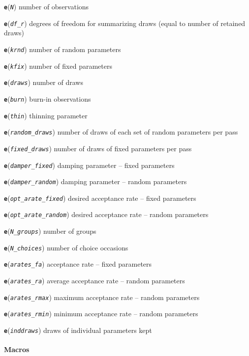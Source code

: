 \documentclass[11pt]{article}
\begin{document}
\textbf{\texttt{e}}(\emph{\texttt{N}}) number of observations

\textbf{\texttt{e}}(\emph{\texttt{df\_r}}) degrees of freedom for
summarizing draws (equal to number of retained draws)

\textbf{\texttt{e}}(\emph{\texttt{krnd}}) number of random parameters

\textbf{\texttt{e}}(\emph{\texttt{kfix}}) number of fixed parameters

\textbf{\texttt{e}}(\emph{\texttt{draws}}) number of draws

\textbf{\texttt{e}}(\emph{\texttt{burn}}) burn-in observations

\textbf{\texttt{e}}(\emph{\texttt{thin}}) thinning parameter

\textbf{\texttt{e}}(\emph{\texttt{random\_draws}}) number of draws of
each set of random parameters per pass

\textbf{\texttt{e}}(\emph{\texttt{fixed\_draws}}) number of draws of
fixed parameters per pass

\textbf{\texttt{e}}(\emph{\texttt{damper\_fixed}}) damping parameter --
fixed parameters

\textbf{\texttt{e}}(\emph{\texttt{damper\_random}}) damping parameter --
random parameters

\textbf{\texttt{e}}(\emph{\texttt{opt\_arate\_fixed}}) desired
acceptance rate -- fixed parameters

\textbf{\texttt{e}}(\emph{\texttt{opt\_arate\_random}}) desired
acceptance rate -- random parameters

\textbf{\texttt{e}}(\emph{\texttt{N\_groups}}) number of groups

\textbf{\texttt{e}}(\emph{\texttt{N\_choices}}) number of choice
occasions

\textbf{\texttt{e}}(\emph{\texttt{arates\_fa}}) acceptance rate -- fixed
parameters

\textbf{\texttt{e}}(\emph{\texttt{arates\_ra}}) average acceptance rate
-- random parameters

\textbf{\texttt{e}}(\emph{\texttt{arates\_rmax}}) maximum acceptance
rate -- random parameters

\textbf{\texttt{e}}(\emph{\texttt{arates\_rmin}}) minimum acceptance
rate -- random parameters

\textbf{\texttt{e}}(\emph{\texttt{inddraws}}) draws of individual
parameters kept

\hypertarget{macros}{%
\paragraph{Macros}\label{macros}}
\end{document}
